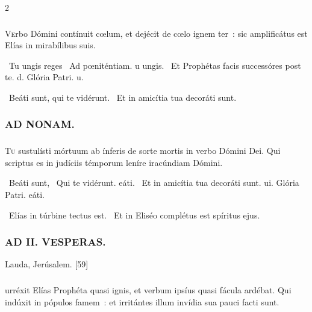 \documentclass[9pt,twoside]{extarticle}
\begin{document}
\begin{multicols}{2}
{\subsubsection*{}
\lettrine{V}erbo Dómini contínuit cœlum, et dejécit de cœlo ignem ter~: sic amplificátus est Elías in mirabílibus suis.

\begin{tightlist}
\item {}~Tu ungis reges \textred{*}~Ad pœniténtiam. u ungis. ~Et Prophétas facis successóres post te. d. Glória Patri. u.
\item {}~Beáti sunt, qui te vidérunt. ~Et in amicítia tua decoráti sunt.
\end{tightlist}

\subsubsection*{\center \textsc{AD NONAM.}}
\subsubsection*{}
\lettrine{T}u sustulísti mórtuum ab ínferis de sorte mortis in verbo Dómini Dei. Qui scriptus es in judíciis témporum leníre iracúndiam Dómini.

\begin{tightlist}
\item {}~Beáti sunt, \textred{*}~Qui te vidérunt. eáti. ~Et in amicítia tua decoráti sunt. ui. Glória Patri. eáti.
\item {}~Elías in túrbine tectus est. ~Et in Eliséo complétus est spíritus ejus.
\end{tightlist}

\subsubsection*{\center \textsc{AD II. VESPERAS.}}
\begin{tightlist}
\item {} Lauda, Jerúsalem. [59]
\end{tightlist}

\subsubsection*{}
urréxit Elías Prophéta quasi ignis, et verbum ipsíus quasi fácula ardébat. Qui indúxit in pópulos famem~: et irritántes illum invídia sua pauci facti sunt.

}
\end{multicols}
\end{document}
